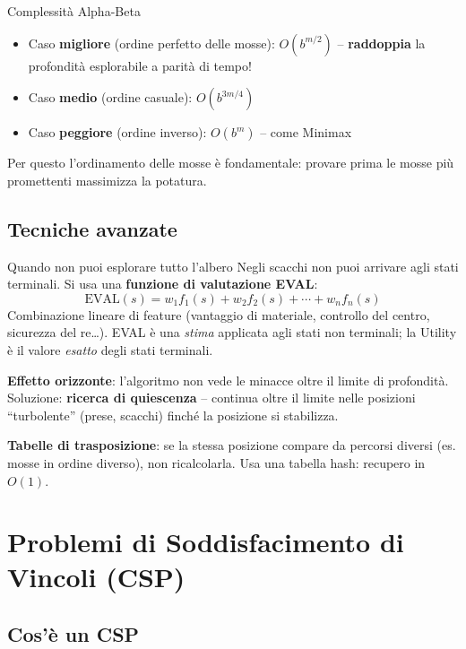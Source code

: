 \documentclass[12pt,a4paper]{article}
\begin{document}
\begin{ricorda}{Complessità Alpha-Beta}
\begin{itemize}[noitemsep]
  \item Caso \textbf{migliore} (ordine perfetto delle mosse): $O(b^{m/2})$ -- \textbf{raddoppia} la profondità esplorabile a parità di tempo!
  \item Caso \textbf{medio} (ordine casuale): $O(b^{3m/4})$
  \item Caso \textbf{peggiore} (ordine inverso): $O(b^m)$ -- come Minimax
\end{itemize}
Per questo l'ordinamento delle mosse è fondamentale: provare prima le mosse più promettenti massimizza la potatura.
\end{ricorda}

\subsection{Tecniche avanzate}

\begin{narrativo}{Quando non puoi esplorare tutto l'albero}
Negli scacchi non puoi arrivare agli stati terminali. Si usa una \textbf{funzione di valutazione EVAL}:
\[
\text{EVAL}(s) = w_1 f_1(s) + w_2 f_2(s) + \cdots + w_n f_n(s)
\]
Combinazione lineare di feature (vantaggio di materiale, controllo del centro, sicurezza del re\ldots). EVAL è una \emph{stima} applicata agli stati non terminali; la Utility è il valore \emph{esatto} degli stati terminali.

\textbf{Effetto orizzonte}: l'algoritmo non vede le minacce oltre il limite di profondità. Soluzione: \textbf{ricerca di quiescenza} -- continua oltre il limite nelle posizioni ``turbolente'' (prese, scacchi) finché la posizione si stabilizza.

\textbf{Tabelle di trasposizione}: se la stessa posizione compare da percorsi diversi (es. mosse in ordine diverso), non ricalcolarla. Usa una tabella hash: recupero in $O(1)$.
\end{narrativo}

\section{Problemi di Soddisfacimento di Vincoli (CSP)}

\subsection{Cos'è un CSP}
\end{document}
